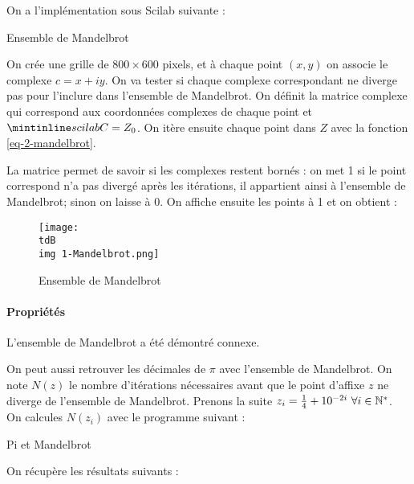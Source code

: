 			On a l'implémentation sous Scilab suivante :
			\begin{listing}[H]
				\caption{Ensemble de Mandelbrot}
				\label{code-2-mandelbrot}
			\end{listing}

			On crée une grille de $800\times600$ pixels, et à chaque point $(x,y)$ on associe le complexe $c = x + iy$.
			On va tester si chaque complexe correspondant ne diverge pas pour l'inclure dans l'ensemble de Mandelbrot.
			On définit la matrice complexe  qui correspond aux coordonnées complexes de chaque point et $\code{C}=Z_0$.
			On itère ensuite chaque point dans $Z$ avec la fonction \eqref{eq-2-mandelbrot}.

			La matrice  permet de savoir si les complexes restent bornés : on met 1 si le point correspond n'a pas divergé après les itérations, il appartient ainsi à l'ensemble de Mandelbrot; sinon on laisse à 0. On affiche ensuite les points à 1 et on obtient :
			\begin{figure}[H]
				\centering
				\texttt{[image: \\tdB\\img 1-Mandelbrot.png]}
				\caption{Ensemble de Mandelbrot}
				\label{img-2-mandelbrot}
			\end{figure}

		\paragraph{Propriétés}
			\begin{propShort}
				L'ensemble de Mandelbrot a été démontré connexe.
			\end{propShort}

			On peut aussi retrouver les décimales de $\pi$ avec l'ensemble de Mandelbrot.
			On note $N(z)$ le nombre d'itérations nécessaires avant que le point d'affixe $z$ ne diverge de l'ensemble de Mandelbrot.
			Prenons la suite $z_i = \frac{1}{4} + 10^{-2i} ~\forall i \in \mathbb{N}^*$. On calcules $N(z_i)$ avec le programme suivant :

			\begin{listing}[H]
				\caption{Pi et Mandelbrot}
				\label{code-2-piMandelbrot}
			\end{listing}

			On récupère les résultats suivants :

